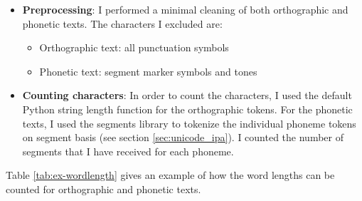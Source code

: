 \begin{description}[style=unboxed]
\begin{itemize}
    \item \textbf{Preprocessing}: I performed a minimal cleaning of both orthographic and phonetic texts. The characters I excluded are:
    \begin{itemize}
        \item Orthographic text: all punctuation symbols
        \item Phonetic text: segment marker symbols and tones
    \end{itemize}
    \item \textbf{Counting characters}: In order to count the characters, I used the default Python string length function for the orthographic tokens. For the phonetic texts, I used the segments library to tokenize the individual phoneme tokens on segment basis (see section \ref{sec:unicode_ipa}).  I counted the number of segments that I have received for each phoneme. 
\end{itemize}
Table \ref{tab:ex-wordlength} gives an example of how the word lengths can be counted for orthographic and phonetic texts.


\end{description}
